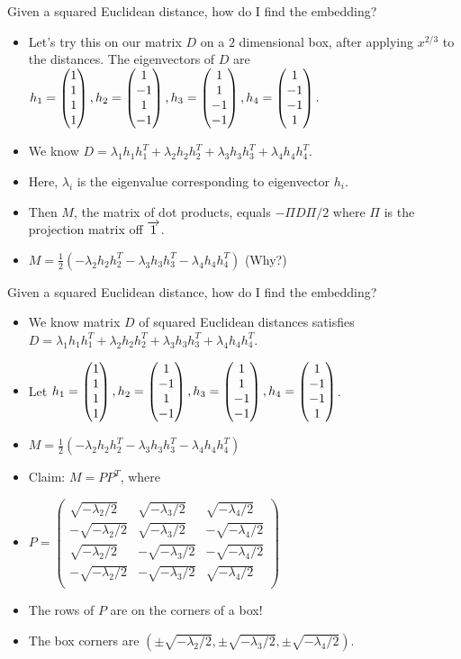 \begin{frame}{Given a squared Euclidean distance, how do I find the
   embedding?}
   \begin{itemize}[<+->]
   \item Let's try this on our matrix $D$ on a $2$ dimensional box, after
   applying $x^{2/3}$ to the distances. The eigenvectors of $D$ are $h_1 = \begin{pmatrix} 1 \\ 1 \\ 1 \\ 1 \end{pmatrix}, h_2 = \begin{pmatrix} 1 \\ -1 \\ 1 \\ -1 \end{pmatrix},
   h_3 = \begin{pmatrix} 1 \\ 1 \\ -1 \\ -1 \end{pmatrix} , h_4 = \begin{pmatrix} 1 \\ -1 \\ -1 \\ 1 \end{pmatrix} .$
   \item We know $D = \lambda_1 h_1 h_1^T  + \lambda_2 h_2 h_2^T +
   \lambda_3 h_3 h_3^T + \lambda_4 h_4 h_4^T$.
   \item Here, $\lambda_i$ is the eigenvalue corresponding to
   eigenvector $h_i$.
   \item Then $M$, the matrix of dot products, equals $- \Pi D \Pi / 2$ where $\Pi$ is the projection matrix
   off $\overrightarrow{1}$.
   \item $M = \frac{1}{2} (-\lambda_2 h_2 h_2^T -
   \lambda_3 h_3 h_3^T - \lambda_4 h_4 h_4^T)$ (Why?)
 \end{itemize}
 \end{frame}
 \begin{frame}{Given a squared Euclidean distance, how do I find the
   embedding?}
   \begin{itemize}
   \item We know matrix $D$ of squared Euclidean distances satisfies $D = \lambda_1 h_1 h_1^T  + \lambda_2 h_2 h_2^T +
   \lambda_3 h_3 h_3^T + \lambda_4 h_4 h_4^T$.
   \item Let $h_1 = \begin{pmatrix} 1 \\ 1 \\ 1 \\ 1 \end{pmatrix}, h_2 = \begin{pmatrix} 1 \\ -1 \\ 1 \\ -1 \end{pmatrix}, h_3 = \begin{pmatrix} 1 \\ 1 \\ -1 \\ -1 \end{pmatrix} , h_4 = \begin{pmatrix} 1 \\ -1 \\ -1 \\ 1 \end{pmatrix} $. 
   \item <+-> $M =  \frac{1}{2} (-\lambda_2 h_2 h_2^T -
   \lambda_3 h_3 h_3^T - \lambda_4 h_4 h_4^T)$
   \item <+-> Claim: $M = PP^T$, where
   \item <+-> $P = 
   \begin{pmatrix} 
   \sqrt{-\lambda_2 / 2} & \sqrt{-\lambda_3 / 2} & \sqrt{-\lambda_4 / 2}\\ 
   -\sqrt{-\lambda_2 / 2} & \sqrt{-\lambda_3 / 2} & -\sqrt{-\lambda_4 / 2}\\ 
   \sqrt{-\lambda_2 / 2} & -\sqrt{-\lambda_3 / 2} & -\sqrt{-\lambda_4 / 2}\\ 
   -\sqrt{-\lambda_2 / 2} & -\sqrt{-\lambda_3 / 2} & \sqrt{-\lambda_4 / 2}\\ 
   \end{pmatrix}
   $
   \item <+-> The rows of $P$ are on the corners of a box! 
   \item <+-> The box corners are $( \pm \sqrt{-\lambda_2/2}, \pm
       \sqrt{-\lambda_3/2}, \pm\sqrt{-\lambda_4/2})$.
   \end{itemize}
 \end{frame}
